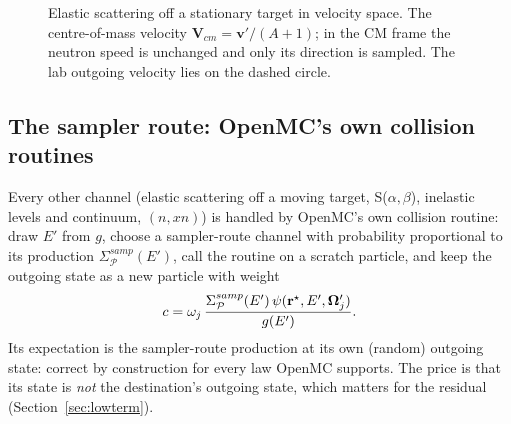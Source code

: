 \begin{figure}[t]\centering
{}
\caption{Elastic scattering off a stationary target in velocity space. The centre-of-mass velocity
$\mathbf V_{cm}=\mathbf v'/(A+1)$; in the CM frame the neutron speed is unchanged and only its direction
is sampled. The lab outgoing velocity lies on the dashed circle.}\label{fig:kinematics}
\end{figure}

\subsection{The sampler route: OpenMC's own collision routines}

Every other channel (elastic scattering off a moving target, S($\alpha,\beta$), inelastic levels and
continuum, $(n,xn)$) is handled by OpenMC's own collision routine: draw $E'$ from $g$, choose a
sampler-route channel with probability proportional to its production
$\Sigma^{samp}_{\mathcal P}(E')$, call the routine on a scratch particle, and keep the outgoing state
as a new particle with weight
\begin{equation}\label{eq:sampler_weight}
c=\omega_j\,\frac{\Sigma^{samp}_{\mathcal P}(E')\,\psi(\mathbf r^\star,E',\boldsymbol\Omega'_j)}{g(E')} .
\end{equation}
Its expectation is the sampler-route production at its own (random) outgoing state: correct by
construction for every law OpenMC supports. The price is that its state is \emph{not} the destination's
outgoing state, which matters for the residual (Section~\ref{sec:lowterm}).

